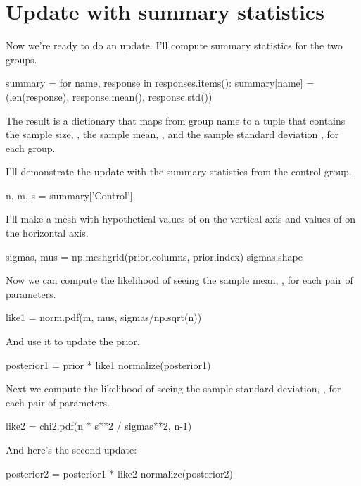 \documentclass[12pt]{book}
\theoremstyle{exercise}
\begin{document}
\section{Update with summary statistics}

Now we're ready to do an update. I'll compute summary statistics for the
two groups.

\begin{code}
summary = {}
for name, response in responses.items():
    summary[name] = (len(response), 
                     response.mean(), 
                     response.std())
\end{code}

The result is a dictionary that maps from group name to a tuple that
contains the sample size, , the sample mean,
, and the sample standard deviation
, for each group.

I'll demonstrate the update with the summary statistics from the control
group.

\begin{code}
n, m, s = summary['Control']
\end{code}

I'll make a mesh with hypothetical values of
 on the vertical axis and values of
 on the horizontal axis.

\begin{code}
sigmas, mus = np.meshgrid(prior.columns, prior.index)
sigmas.shape
\end{code}

Now we can compute the likelihood of seeing the sample mean,
, for each pair of parameters.

\begin{code}
like1 = norm.pdf(m, mus, sigmas/np.sqrt(n))
\end{code}

And use it to update the prior.

\begin{code}
posterior1 = prior * like1
normalize(posterior1)
\end{code}

Next we compute the likelihood of seeing the sample standard deviation, , for each pair of parameters.

\begin{code}
like2 = chi2.pdf(n * s**2 / sigmas**2, n-1)
\end{code}

And here's the second update:

\begin{code}
posterior2 = posterior1 * like2
normalize(posterior2)
\end{code}
\end{document}
